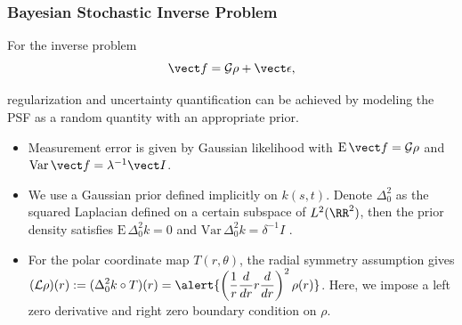 \documentclass[]{beamer}
\begin{document}
%
\begin{frame}
  \frametitle{Bayesian Stochastic Inverse Problem}
  {\footnotesize For the inverse problem}
  \begin{equation*}
    \vect f = \mathcal G \rho + \vect \epsilon,
  \end{equation*}
  {\footnotesize
  regularization and uncertainty quantification can be achieved by modeling the PSF as a random quantity with an appropriate prior.
  \begin{itemize}
    \itemsep 1.2em
    \item Measurement error is given by \alert{Gaussian likelihood} with \alert{$\mathrm E\,\vect f = \mathcal G \rho$} and \alert{$\mathrm{Var}\,\vect f = \lambda^{-1}\vect I$}. 
    \item We use a \alert{Gaussian prior} defined implicitly on $k(s,t)$. Denote $\Delta^2_0$ as the squared Laplacian defined on a certain subspace of $L^2(\RR^2)$, then the prior density satisfies \alert{$\mathrm E\, \Delta^2_0 k = 0$} and \alert{$\mathrm{Var}\,\Delta^2_0 k = \delta^{-1} I$} \cite{stuart13bayesian}.
    \item For the polar coordinate map $T(r,\theta)$, the radial symmetry assumption gives $\displaystyle{(\mathcal L\rho)(r) := (\Delta^2_0 k \circ T)(r) = \alert{\left(\frac{1}{r} \frac{d}{dr} r\frac{d}{dr}\right)^2 \rho(r)}}$. Here, we impose a left zero derivative and right zero boundary condition on \alert{$\rho$}.
  \end{itemize}
  }
\end{frame}
\end{document}
